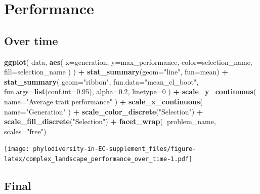 \documentclass[]{book}
\newenvironment{Shaded}{\begin{snugshade}}{\end{snugshade}}
\newcommand{\DataTypeTok}[1]{\textcolor[rgb]{0.13,0.29,0.53}{#1}}
\newcommand{\DecValTok}[1]{\textcolor[rgb]{0.00,0.00,0.81}{#1}}
\newcommand{\FloatTok}[1]{\textcolor[rgb]{0.00,0.00,0.81}{#1}}
\newcommand{\KeywordTok}[1]{\textcolor[rgb]{0.13,0.29,0.53}{\textbf{#1}}}
\newcommand{\NormalTok}[1]{#1}
\newcommand{\OperatorTok}[1]{\textcolor[rgb]{0.81,0.36,0.00}{\textbf{#1}}}
\newcommand{\StringTok}[1]{\textcolor[rgb]{0.31,0.60,0.02}{#1}}
\begin{document}
\hypertarget{performance-1}{%
\section{Performance}\label{performance-1}}

\hypertarget{over-time-3}{%
\subsection{Over time}\label{over-time-3}}

\begin{Shaded}
\begin{Highlighting}[]
\KeywordTok{ggplot}\NormalTok{(}
\NormalTok{    data,}
    \KeywordTok{aes}\NormalTok{(}
      \DataTypeTok{x=}\NormalTok{generation,}
      \DataTypeTok{y=}\NormalTok{max_performance,}
      \DataTypeTok{color=}\NormalTok{selection_name,}
      \DataTypeTok{fill=}\NormalTok{selection_name}
\NormalTok{    )}
\NormalTok{  ) }\OperatorTok{+}
\StringTok{  }\KeywordTok{stat_summary}\NormalTok{(}\DataTypeTok{geom=}\StringTok{"line"}\NormalTok{, }\DataTypeTok{fun=}\NormalTok{mean) }\OperatorTok{+}
\StringTok{  }\KeywordTok{stat_summary}\NormalTok{(}
    \DataTypeTok{geom=}\StringTok{"ribbon"}\NormalTok{,}
    \DataTypeTok{fun.data=}\StringTok{"mean_cl_boot"}\NormalTok{,}
    \DataTypeTok{fun.args=}\KeywordTok{list}\NormalTok{(}\DataTypeTok{conf.int=}\FloatTok{0.95}\NormalTok{),}
    \DataTypeTok{alpha=}\FloatTok{0.2}\NormalTok{,}
    \DataTypeTok{linetype=}\DecValTok{0}
\NormalTok{  ) }\OperatorTok{+}
\StringTok{  }\KeywordTok{scale_y_continuous}\NormalTok{(}
    \DataTypeTok{name=}\StringTok{"Average trait performance"}
\NormalTok{  ) }\OperatorTok{+}
\StringTok{  }\KeywordTok{scale_x_continuous}\NormalTok{(}
    \DataTypeTok{name=}\StringTok{"Generation"}
\NormalTok{  ) }\OperatorTok{+}
\StringTok{  }\KeywordTok{scale_color_discrete}\NormalTok{(}\StringTok{"Selection"}\NormalTok{) }\OperatorTok{+}\StringTok{ }
\StringTok{  }\KeywordTok{scale_fill_discrete}\NormalTok{(}\StringTok{"Selection"}\NormalTok{) }\OperatorTok{+}
\StringTok{  }\KeywordTok{facet_wrap}\NormalTok{(}\OperatorTok{~}\NormalTok{problem_name, }\DataTypeTok{scales=}\StringTok{"free"}\NormalTok{)}
\end{Highlighting}
\end{Shaded}

\texttt{[image: phylodiversity-in-EC-supplement\_files/figure-latex/complex\_landscape\_performance\_over\_time-1.pdf]}

\hypertarget{final-3}{%
\subsection{Final}\label{final-3}}
\end{document}
